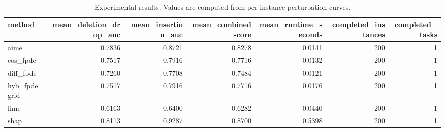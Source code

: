 \begin{table}[t]
\caption{Experimental results. Values are computed from per-instance perturbation curves.}
\label{tab:main_results_computed}
\centering
\begin{tabular}{lrrrrrr}
\toprule
method & mean\_deletion\_drop\_auc & mean\_insertion\_auc & mean\_combined\_score & mean\_runtime\_seconds & completed\_instances & completed\_tasks \\
\midrule
aime & 0.7836 & 0.8721 & 0.8278 & 0.0141 & 200 & 1 \\
cos\_fpde & 0.7517 & 0.7916 & 0.7716 & 0.0132 & 200 & 1 \\
diff\_fpde & 0.7260 & 0.7708 & 0.7484 & 0.0121 & 200 & 1 \\
hyb\_fpde\_grid & 0.7517 & 0.7916 & 0.7716 & 0.0176 & 200 & 1 \\
lime & 0.6163 & 0.6400 & 0.6282 & 0.0440 & 200 & 1 \\
shap & 0.8113 & 0.9287 & 0.8700 & 0.5398 & 200 & 1 \\
\bottomrule
\end{tabular}

\end{table}
